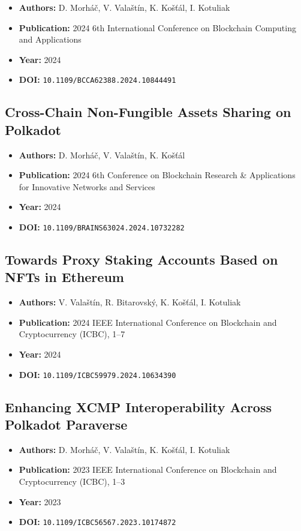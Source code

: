 \begin{itemize}
    \item \textbf{Authors:} D. Morháč, V. Valaštín, K. Košťál, I. Kotuliak
    \item \textbf{Publication:} 2024 6th International Conference on Blockchain Computing and Applications
    \item \textbf{Year:} 2024
    \item \textbf{DOI:} \texttt{10.1109/BCCA62388.2024.10844491}
\end{itemize}

\subsection{Cross-Chain Non-Fungible Assets Sharing on Polkadot}

\begin{itemize}
    \item \textbf{Authors:} D. Morháč, V. Valaštín, K. Košťál
    \item \textbf{Publication:} 2024 6th Conference on Blockchain Research \& Applications for Innovative Networks and Services
    \item \textbf{Year:} 2024
    \item \textbf{DOI:} \texttt{10.1109/BRAINS63024.2024.10732282}
\end{itemize}

\subsection{Towards Proxy Staking Accounts Based on NFTs in Ethereum}

\begin{itemize}
    \item \textbf{Authors:} V. Valaštín, R. Bitarovský, K. Košťál, I. Kotuliak
    \item \textbf{Publication:} 2024 IEEE International Conference on Blockchain and Cryptocurrency (ICBC), 1--7
    \item \textbf{Year:} 2024
    \item \textbf{DOI:} \texttt{10.1109/ICBC59979.2024.10634390}
\end{itemize}

\subsection{Enhancing XCMP Interoperability Across Polkadot Paraverse}

\begin{itemize}
    \item \textbf{Authors:} D. Morháč, V. Valaštín, K. Košťál, I. Kotuliak
    \item \textbf{Publication:} 2023 IEEE International Conference on Blockchain and Cryptocurrency (ICBC), 1--3
    \item \textbf{Year:} 2023
    \item \textbf{DOI:} \texttt{10.1109/ICBC56567.2023.10174872}
\end{itemize}

